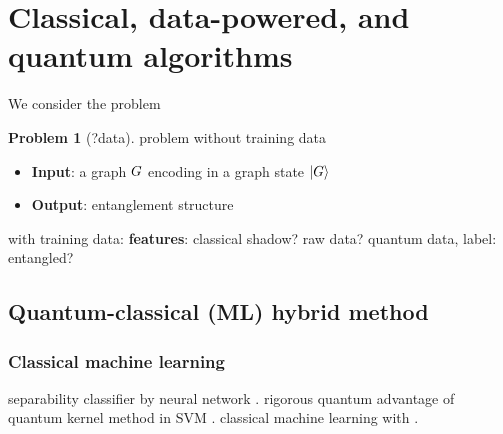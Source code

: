 \documentclass[
10pt,
aps,
pra,
linenumbers,
floatfix,
]{revtex4-2}
\theoremstyle{plain}
\theoremstyle{definition}
\newtheorem{problem}{Problem}
\begin{document}
\section{Classical, data-powered, and quantum algorithms}
We consider the problem 
\begin{problem}[?data]
	problem without training data
	\begin{itemize}
		\item \textbf{Input}: a graph $G$ encoding in a graph state $\ket{G}$
		\item \textbf{Output}: entanglement structure
	\end{itemize}
\end{problem}
with training data: \textbf{features}: classical shadow? raw data? quantum data, label: entangled?

\subsection{Quantum-classical (ML) hybrid method}
\subsubsection{Classical machine learning}\label{sec:classical_machine_learning}
separability classifier by neural network \cite{luSeparabilityEntanglementClassifierMachine2018}.
rigorous quantum advantage of quantum kernel method in SVM \cite{liuRigorousRobustQuantum2021}.
classical machine learning with  \cite{huangProvablyEfficientMachine2021}.
\end{document}
